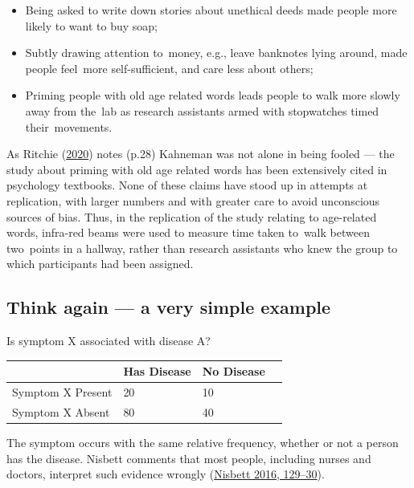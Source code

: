 \documentclass[
  10pt,
  b5paper]{book}
\providecommand{\tightlist}{%
  \setlength{\itemsep}{0pt}\setlength{\parskip}{0pt}}
\begin{document}
\begin{itemize}
\tightlist
\item
  Being asked to write down stories about unethical deeds made people more likely to want to buy soap;
\item
  Subtly drawing attention to~money, e.g., leave banknotes lying around, made people feel~more self-sufficient, and care less about others;
\item
  Priming people with old age related words leads people to walk more slowly away from the~lab as research assistants armed with stopwatches timed their~movements.
\end{itemize}

As Ritchie (\protect\hyperlink{ref-ritchie2020science}{2020}) notes (p.28) Kahneman was not alone in being fooled --- the study about priming with old age related words has been extensively cited in psychology textbooks. None of these claims have stood up in attempts at replication, with larger numbers and with greater care to avoid unconscious sources of bias. Thus, in the replication of the study relating to age-related words, infra-red beams were used to measure time taken to~walk between two~points in a hallway, rather than research assistants who knew the group to which participants had been assigned.

\hypertarget{think-again-a-very-simple-example}{%
\subsection*{Think again --- a very simple example}\label{think-again-a-very-simple-example}}

Is symptom X associated with disease A?

\begin{longtable}[]{@{}llll@{}}
\toprule\noalign{}
& Has Disease & No Disease & \\
\midrule\noalign{}
\endhead
\bottomrule\noalign{}
\endlastfoot
Symptom X Present & 20 & 10 & \\
Symptom X Absent & 80 & 40 & \\
\end{longtable}

The symptom occurs with the same relative frequency, whether or not a person has the disease. Nisbett comments that most people, including nurses and doctors, interpret such evidence wrongly (\protect\hyperlink{ref-nisbett}{Nisbett 2016, 129--30}).
\end{document}
